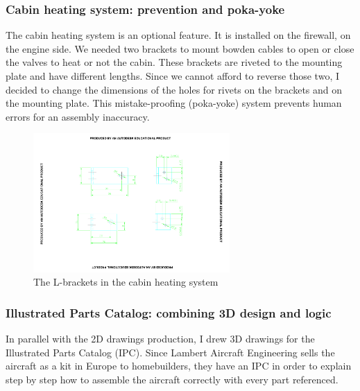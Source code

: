\documentclass[11pt,a4paper]{article}
\begin{document}
\newpage

\subsubsection{Cabin heating system: prevention and poka-yoke}

The cabin heating system is an optional feature. It is installed on the firewall, on the engine side. We needed two brackets to mount bowden cables to open or close the valves to heat or not the cabin. These brackets are riveted to the mounting plate and have different lengths. Since we cannot afford to reverse those two, I decided to change the dimensions of the holes for rivets on the brackets and on the mounting plate. This mistake-proofing (poka-yoke) system prevents human errors for an assembly inaccuracy.

\begin{figure}[ht!]
	\begin{center}
		\includegraphics[width=7.5cm,trim = 6cm 4cm 6cm 3cm, clip]{pics/PIC009.pdf}
		\caption{The L-brackets in the cabin heating system}
		\label{fig:PIC009}
	\end{center}
\end{figure}

\newpage

\subsubsection{Illustrated Parts Catalog: combining 3D design and logic}

In parallel with the 2D drawings production, I drew 3D drawings for the Illustrated Parts Catalog (IPC). Since Lambert Aircraft Engineering sells the aircraft as a kit in Europe to homebuilders, they have an IPC in order to explain step by step how to assemble the aircraft correctly with every part referenced.
\end{document}
